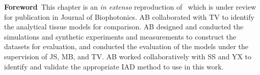 \begin{center}
\begin{minipage}[b]{0.9\linewidth}
\small
\textbf{Foreword\,}
This chapter is an \emph{in extenso} reproduction of~\citet{Bahl2023a} which is under review for publication in Journal of Biophotonics. 
\newline
AB collaborated with TV to identify the analytical tissue models for comparison. AB 
designed and conducted the simulations and synthetic experiments and measurements to construct the datasets for evaluation, and conducted the evaluation of the models under the supervision of JS, MB, and TV. AB worked collaboratively with SS and YX to identify and validate the appropriate IAD method to use in this work. 
\end{minipage}
\end{center}

\minitoc



